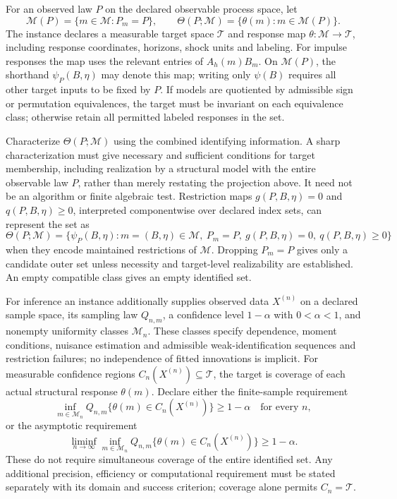 \documentclass[11pt,a4paper]{article}
\begin{document}
For an observed law \(P\) on the declared observable process space, let
\[
 \mathcal M(P)=\{m\in\mathcal M:P_m=P\},\qquad
 \Theta(P;\mathcal M)=\{\theta(m):m\in\mathcal M(P)\}.
\]
The instance declares a measurable target space \(\mathcal T\) and response map \(\theta:\mathcal M\to\mathcal T\), including response coordinates, horizons, shock units and labeling. For impulse responses the map uses the relevant entries of \(A_h(m)B_m\). On \(\mathcal M(P)\), the shorthand \(\psi_P(B,\eta)\) may denote this map; writing only \(\psi(B)\) requires all other target inputs to be fixed by \(P\). If models are quotiented by admissible sign or permutation equivalences, the target must be invariant on each equivalence class; otherwise retain all permitted labeled responses in the set.

Characterize \(\Theta(P;\mathcal M)\) using the combined identifying information. A sharp characterization must give necessary and sufficient conditions for target membership, including realization by a structural model with the entire observable law \(P\), rather than merely restating the projection above. It need not be an algorithm or finite algebraic test. Restriction maps \(g(P,B,\eta)=0\) and \(q(P,B,\eta)\geq0\), interpreted componentwise over declared index sets, can represent the set as
\[
 \Theta(P;\mathcal M)=\{\psi_P(B,\eta):m=(B,\eta)\in\mathcal M,\ P_m=P,\ g(P,B,\eta)=0,\ q(P,B,\eta)\geq0\}
\]
when they encode maintained restrictions of \(\mathcal M\). Dropping \(P_m=P\) gives only a candidate outer set unless necessity and target-level realizability are established. An empty compatible class gives an empty identified set.

For inference an instance additionally supplies observed data \(X^{(n)}\) on a declared sample space, its sampling law \(Q_{n,m}\), a confidence level \(1-\alpha\) with \(0<\alpha<1\), and nonempty uniformity classes \(\mathcal M_n\). These classes specify dependence, moment conditions, nuisance estimation and admissible weak-identification sequences and restriction failures; no independence of fitted innovations is implicit. For measurable confidence regions \(C_n(X^{(n)})\subseteq\mathcal T\), the target is coverage of each actual structural response \(\theta(m)\). Declare either the finite-sample requirement
\[
 \inf_{m\in\mathcal M_n}Q_{n,m}\{\theta(m)\in C_n(X^{(n)})\}\geq1-\alpha
 \quad\text{for every }n,
\]
or the asymptotic requirement
\[
 \liminf_{n\to\infty}\inf_{m\in\mathcal M_n}
 Q_{n,m}\{\theta(m)\in C_n(X^{(n)})\}\geq1-\alpha.
\]
These do not require simultaneous coverage of the entire identified set. Any additional precision, efficiency or computational requirement must be stated separately with its domain and success criterion; coverage alone permits \(C_n=\mathcal T\).
\end{document}

